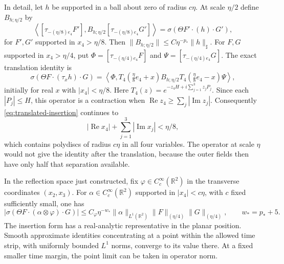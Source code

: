 \documentclass[11pt,letterpaper,reqno]{amsart}
\makeatletter
\theoremstyle{definition}
\newcommand{\ms@minorstart}{%
  \pushQED{\qed}\renewcommand{\qedsymbol}{$\blacksquare$}}
\newenvironment{lemma}[1][]{\ms@minorstart\ms@lemma[#1]}
  {\popQED\endms@lemma}
\theoremstyle{remark}
\newcommand{\R}{\mathbb R}
\makeatother
\begin{document}
In detail, let $h$ be supported in a ball about zero of radius
$c\eta$. At scale $\eta/2$ define $B_{h;\eta/2}$ by
\[
 \left\langle[\tau_{-(\eta/8)e_4}F'],
    B_{h;\eta/2}[\tau_{-(\eta/8)e_4}G']\right\rangle
       =\sigma(\Theta F'\cdot(h)\cdot G'),
\]
for $F',G'$ supported in $x_4>\eta/8$. Then
$\|B_{h;\eta/2}\|\le C\eta^{-p_*}\|h\|_\sharp$.
For $F,G$ supported in $x_4>\eta/4$, put
$\Phi=[\tau_{-(\eta/4)e_4}F]$ and
$\Psi=[\tau_{-(\eta/4)e_4}G]$. The exact translation identity is
\begin{equation}\label{eq:translated-insertion}
 \sigma(\Theta F\cdot(\tau_xh)\cdot G)
 =\left\langle\Phi,
 T_4(\tfrac\eta8e_4+x)B_{h;\eta/2}
 T_4(\tfrac\eta8e_4-x)\Psi\right\rangle,
\end{equation}
initially for real $x$ with $|x_4|<\eta/8$. Here
$T_4(z)=e^{-z_4H+i\sum_{j=1}^3z_jP_j}$. Since each $|P_j|\le H$,
this operator is a contraction when
$\operatorname{Re}z_4\ge\sum_j|\operatorname{Im}z_j|$.
Consequently \eqref{eq:translated-insertion} continues to
\[
 |\operatorname{Re}x_4|
            +\sum_{j=1}^3|\operatorname{Im}x_j|<\eta/8,
\]
which contains polydiscs of radius $c\eta$ in all four variables.
The operator at scale $\eta$ would not give the identity after the
translation, because the outer fields then have only half that
separation available.

\begin{lemma}[The integral norm of a plate]\label{lem:plate-integral}
In the reflection space just constructed, fix
$\varphi\in C_c^\infty(\R^2)$ in the transverse coordinates $(x_2,x_3)$.
For $\alpha\in C_c^\infty(\R^2)$ supported in $|x_4|<c\eta$,
with $c$ fixed sufficiently small, one has
\begin{equation}\label{eq:plate-bound}
 |\sigma(\Theta F\cdot(\alpha\otimes\varphi)\cdot G)|
 \le C_\varphi\eta^{-w_*}\|\alpha\|_{L^1(\R^2)}
                  \|F\|_{(\eta/4)}\|G\|_{(\eta/4)},
 \qquad w_*=p_*+5.
\end{equation}
The insertion form has a real-analytic representative in the planar
position. Smooth approximate identities concentrating at a point within
the allowed time strip, with uniformly bounded $L^1$ norms, converge
to its value there. At a fixed smaller time margin, the point limit
can be taken in operator norm.
\end{lemma}
\end{document}
